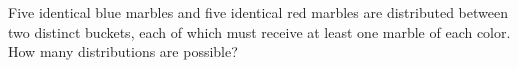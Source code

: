 Five identical blue marbles and five identical red marbles are distributed between two distinct buckets, each of which must receive at least one marble of each color. How many distributions are possible?
